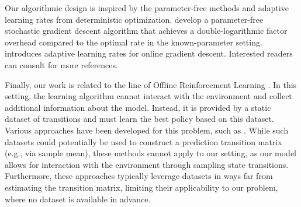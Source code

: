 

Our algorithmic design is inspired by the parameter-free methods and adaptive learning rates from deterministic optimization. \cite{carmon2022making} develop a parameter-free stochastic gradient descent algorithm that achieves a double-logarithmic factor overhead compared to the optimal rate in the known-parameter setting. \cite{streeter2010less} introduces adaptive learning rates for online gradient descent. Interested readers can consult \cite{auer2002adaptive,orabona2014simultaneous,cutkosky2018black,orabona2019modern} for more references.


Finally, our work is related to the line of Offline Reinforcement Learning \cite{levine2020offline}. In this setting, the learning algorithm cannot interact with the environment and collect additional information about the model. Instead, it is provided by a static dataset of transitions and must learn the best policy based on this dataset. Various approaches have been developed for this problem, such as \cite{fujimoto2019off,kumar2019stabilizing,kumar2020conservative,agarwal2020optimistic,wu2019behavior}. While such datasets could potentially be used to construct a prediction transition matrix (e.g., via sample mean), these methods cannot apply to our setting, as our model allows for interaction with the environment through sampling state transitions. Furthermore, these approaches typically leverage datasets in ways far from estimating the transition matrix, limiting their applicability to our problem, where no dataset is available in advance.


